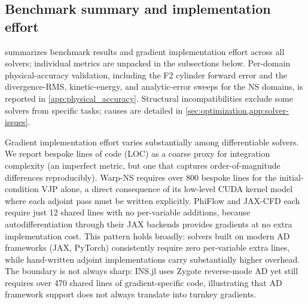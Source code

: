 \documentclass[11pt,a4paper]{article}
\begin{document}
\subsection{Benchmark summary and implementation effort}
\label{sec:baselines}

 summarizes benchmark results and gradient implementation
effort across all solvers; individual metrics are unpacked in the
subsections below.
Per-domain physical-accuracy validation, including the F2 cylinder forward
error and the divergence-RMS, kinetic-energy, and analytic-error sweeps for
the NS domains, is reported in \cref{app:physical_accuracy}.
Structural incompatibilities exclude some solvers from specific tasks;
causes are detailed in \cref{sec:optimization,app:solver-issues}.

Gradient implementation effort varies substantially among differentiable solvers.
We report bespoke lines of code (LOC) as a coarse proxy for integration
complexity (an imperfect metric, but one that captures order-of-magnitude
differences reproducibly).
Warp-NS requires over 800 bespoke lines for the initial-condition VJP alone,
a direct consequence of its low-level CUDA kernel model where each adjoint pass
must be written explicitly.
PhiFlow and JAX-CFD each require just 12 shared lines with no per-variable
additions, because autodifferentiation through their JAX backends provides
gradients at no extra implementation cost.
This pattern holds broadly: solvers built on modern AD frameworks (JAX,
PyTorch) consistently require zero per-variable extra lines, while hand-written
adjoint implementations carry substantially higher overhead.
The boundary is not always sharp: INS.jl uses Zygote reverse-mode AD yet
still requires over 470 shared lines of gradient-specific code,
illustrating that AD framework support does not always translate into
turnkey gradients.
\end{document}
